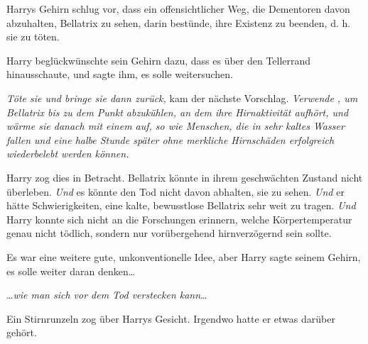 Harrys Gehirn schlug vor, dass ein offensichtlicher Weg, die Dementoren davon abzuhalten, Bellatrix zu sehen, darin bestünde, ihre Existenz zu beenden, d. h. sie zu töten.

Harry beglückwünschte sein Gehirn dazu, dass es über den Tellerrand hinausschaute, und sagte ihm, es solle weitersuchen.

\emph{Töte sie und bringe sie dann zurück,} kam der nächste Vorschlag. \emph{Verwende , um Bellatrix bis zu dem Punkt abzukühlen, an dem ihre Hirnaktivität aufhört, und wärme sie danach mit einem  auf, so wie Menschen, die in sehr kaltes Wasser fallen und eine halbe Stunde später ohne merkliche Hirnschäden erfolgreich wiederbelebt werden können.}

Harry zog dies in Betracht. Bellatrix könnte in ihrem geschwächten Zustand nicht überleben. \emph{Und} es könnte den Tod nicht davon abhalten, sie zu sehen. \emph{Und} er hätte Schwierigkeiten, eine kalte, bewusstlose Bellatrix sehr weit zu tragen. \emph{Und} Harry konnte sich nicht an die Forschungen erinnern, welche Körpertemperatur genau nicht tödlich, sondern nur vorübergehend hirnverzögernd sein sollte.

Es war eine weitere gute, unkonventionelle Idee, aber Harry sagte seinem Gehirn, es solle weiter daran denken…

…\emph{wie man sich vor dem Tod verstecken kann}…

Ein Stirnrunzeln zog über Harrys Gesicht. Irgendwo hatte er etwas darüber gehört.


